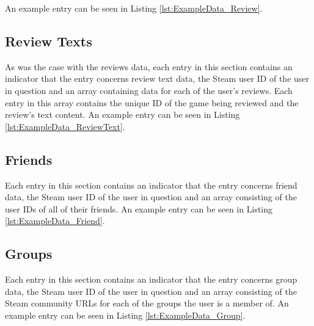 An example entry can be seen in Listing \ref{lst:ExampleData_Review}.



\subsection{Review Texts} \label{sec:BG_Dataset_Texts}

As was the case with the reviews data, each entry in this section contains an indicator that the entry concerns review text data, the Steam user ID of the user in question and an array containing data for each of the user's reviews. Each entry in this array contains the unique ID of the game being reviewed and the review's text content. An example entry can be seen in Listing \ref{lst:ExampleData_ReviewText}.



\subsection{Friends} \label{sec:BG_Dataset_Friends}

Each entry in this section contains an indicator that the entry concerns friend data, the Steam user ID of the user in question and an array consisting of the user IDs of all of their friends. An example entry can be seen in Listing \ref{lst:ExampleData_Friend}.



\subsection{Groups} \label{sec:BG_Dataset_Groups}

Each entry in this section contains an indicator that the entry concerns group data, the Steam user ID of the user in question and an array consisting of the Steam community URLs for each of the groups the user is a member of. An example entry can be seen in Listing \ref{lst:ExampleData_Group}.

